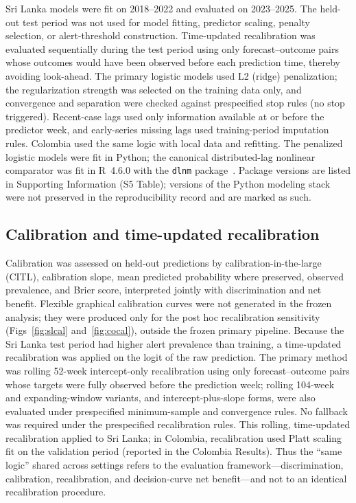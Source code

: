 \documentclass[11pt,a4paper]{article}
\begin{document}
Sri Lanka models were fit on 2018--2022 and evaluated on 2023--2025. The held-out test period was not used for model fitting, predictor scaling, penalty selection, or alert-threshold construction. Time-updated recalibration was evaluated sequentially during the test period using only forecast--outcome pairs whose outcomes would have been observed before each prediction time, thereby avoiding look-ahead. The primary logistic models used L2 (ridge) penalization; the regularization strength was selected on the training data only, and convergence and separation were checked against prespecified stop rules (no stop triggered). Recent-case lags used only information available at or before the predictor week, and early-series missing lags used training-period imputation rules. Colombia used the same logic with local data and refitting. The penalized logistic models were fit in Python; the canonical distributed-lag nonlinear comparator was fit in R~4.6.0 with the \texttt{dlnm} package~\cite{RCoreTeam2026,Gasparrini2011}. Package versions are listed in Supporting Information (S5 Table); versions of the Python modeling stack were not preserved in the reproducibility record and are marked as such.

\subsection{Calibration and time-updated recalibration}
Calibration was assessed on held-out predictions by calibration-in-the-large (CITL), calibration slope, mean predicted probability where preserved, observed prevalence, and Brier score, interpreted jointly with discrimination and net benefit. Flexible graphical calibration curves were not generated in the frozen analysis; they were produced only for the post hoc recalibration sensitivity (Figs~\ref{fig:slcal} and~\ref{fig:cocal}), outside the frozen primary pipeline. Because the Sri Lanka test period had higher alert prevalence than training, a time-updated recalibration was applied on the logit of the raw prediction. The primary method was rolling 52-week intercept-only recalibration using only forecast--outcome pairs whose targets were fully observed before the prediction week; rolling 104-week and expanding-window variants, and intercept-plus-slope forms, were also evaluated under prespecified minimum-sample and convergence rules. No fallback was required under the prespecified recalibration rules. This rolling, time-updated recalibration applied to Sri Lanka; in Colombia, recalibration used Platt scaling fit on the validation period (reported in the Colombia Results). Thus the ``same logic'' shared across settings refers to the evaluation framework---discrimination, calibration, recalibration, and decision-curve net benefit---and not to an identical recalibration procedure.
\end{document}
